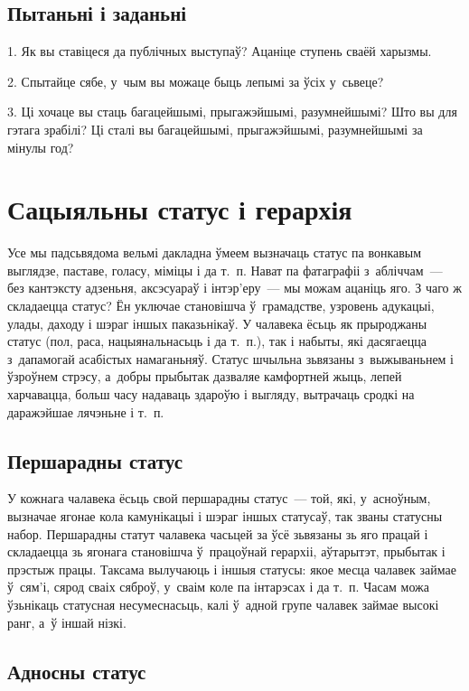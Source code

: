 \subsection*{Пытаньні і заданьні}

1. Як вы ставіцеся да публічных выступаў? Ацаніце ступень сваёй харызмы.

2. Спытайце сябе, у~чым вы можаце быць лепымі за ўсіх у~сьвеце?

3. Ці хочаце вы стаць багацейшымі, прыгажэйшымі, разумнейшымі? Што вы для гэтага зрабілі? Ці сталі вы багацейшымі, прыгажэйшымі, разумнейшымі за мінулы год?


\section{Сацыяльны статус і герархія}

Усе мы падсьвядома вельмі дакладна ўмеем вызначаць статус па вонкавым выглядзе, паставе, голасу, міміцы і да т.~п. Нават па фатаграфіі з~абліччам~--- без кантэксту адзеньня, аксэсуараў і інтэр'еру~--- мы можам ацаніць яго. З чаго ж складаецца статус? Ён уключае становішча ў~грамадстве, узровень адукацыі, улады, даходу і шэраг іншых паказьнікаў. У чалавека ёсьць як прыроджаны статус (пол, раса, нацыянальнасьць і да т.~п.), так і набыты, які дасягаецца з~дапамогай асабістых намаганьняў. Статус шчыльна зьвязаны з~выжываньнем і ўзроўнем стрэсу, а~добры прыбытак дазваляе камфортней жыць, лепей харчавацца, больш часу надаваць здароўю і выгляду, вытрачаць сродкі на даражэйшае лячэньне і т.~п.

\subsection*{Першарадны статус}

У кожнага чалавека ёсьць свой першарадны статус~--- той, які, у~асноўным, вызначае ягонае кола камунікацыі і шэраг іншых статусаў, так званы статусны набор. Першарадны статут чалавека часьцей за ўсё зьвязаны зь яго працай і складаецца зь ягонага становішча ў~працоўнай герархіі, аўтарытэт, прыбытак і прэстыж працы. Таксама вылучаюць і іншыя статусы: якое месца чалавек займае ў~сям'і, сярод сваіх сяброў, у~сваім коле па інтарэсах і да т.~п. Часам можа ўзьнікаць статусная несумеснасьць, калі ў~адной групе чалавек займае высокі ранг, а~ў іншай нізкі.

\subsection*{Адносны статус}

